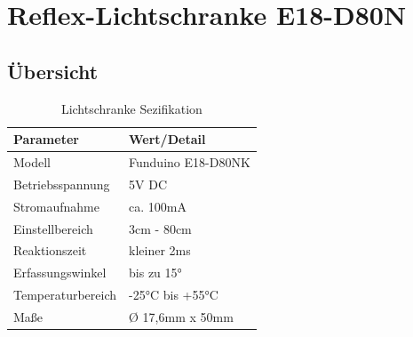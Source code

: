 \section{Reflex-Lichtschranke E18-D80N}
{
\subsection{Übersicht} 

\begin{table}
	\caption{Lichtschranke Sezifikation}
\begin{center}
	\begin{tabular}{|l|l|}
	\hline
	\textbf{Parameter} &\textbf{Wert/Detail}\\
	\hline
	Modell & Funduino E18-D80NK\\
	\hline
	Betriebsspannung & 5V DC\\
	\hline
	Stromaufnahme & ca. 100mA\\
	\hline
	Einstellbereich & 3cm - 80cm\\
	\hline
	Reaktionszeit & kleiner 2ms\\
	\hline
	Erfassungswinkel & bis zu 15°\\
	\hline
	Temperaturbereich & -25°C bis +55°C\\
	\hline
	Maße & Ø 17,6mm x 50mm\\
	\hline
		
\end{tabular}
\end{center}
\end{table}

} 
